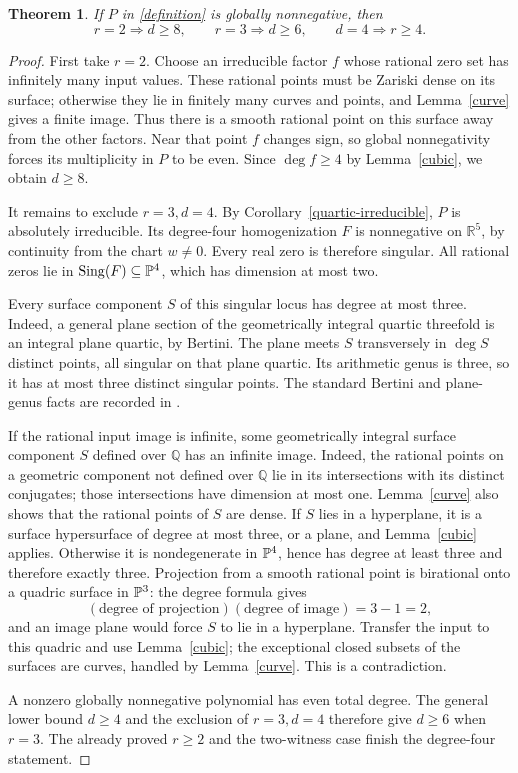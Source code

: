 \documentclass[11pt]{article}
\newtheorem{theorem}{Theorem}[section]
\theoremstyle{remark}\newtheorem{remark}[theorem]{Remark}
\newcommand{\Q}{\mathbb Q}\newcommand{\Z}{\mathbb Z}\newcommand{\R}{\mathbb R}
\newcommand{\Sing}{\operatorname{Sing}}\newcommand{\rad}{\operatorname{rad}}
\begin{document}
\begin{theorem}\label{nonnegative}
If \(P\) in \eqref{definition} is globally nonnegative, then
\[
 r=2\Longrightarrow d\ge8,\qquad
 r=3\Longrightarrow d\ge6,\qquad
 d=4\Longrightarrow r\ge4.
\]
\end{theorem}
\begin{proof}
First take \(r=2\). Choose an irreducible factor \(f\) whose rational zero set has infinitely many input values. These rational points must be Zariski dense on its surface; otherwise they lie in finitely many curves and points, and Lemma~\ref{curve} gives a finite image. Thus there is a smooth rational point on this surface away from the other factors. Near that point \(f\) changes sign, so global nonnegativity forces its multiplicity in \(P\) to be even. Since \(\deg f\ge4\) by Lemma~\ref{cubic}, we obtain \(d\ge8\).

It remains to exclude \(r=3,d=4\). By Corollary~\ref{quartic-irreducible}, \(P\) is absolutely irreducible. Its degree-four homogenization \(F\) is nonnegative on \(\R^5\), by continuity from the chart \(w\ne0\). Every real zero is therefore singular. All rational zeros lie in \(\Sing(F)\subseteq\PP^4\), which has dimension at most two.

Every surface component \(S\) of this singular locus has degree at most three. Indeed, a general plane section of the geometrically integral quartic threefold is an integral plane quartic, by Bertini. The plane meets \(S\) transversely in \(\deg S\) distinct points, all singular on that plane quartic. Its arithmetic genus is three, so it has at most three distinct singular points. The standard Bertini and plane-genus facts are recorded in \cite{Stacks}.

If the rational input image is infinite, some geometrically integral surface component \(S\) defined over \(\Q\) has an infinite image. Indeed, the rational points on a geometric component not defined over \(\Q\) lie in its intersections with its distinct conjugates; those intersections have dimension at most one. Lemma~\ref{curve} also shows that the rational points of \(S\) are dense. If \(S\) lies in a hyperplane, it is a surface hypersurface of degree at most three, or a plane, and Lemma~\ref{cubic} applies. Otherwise it is nondegenerate in \(\mathbb P^4\), hence has degree at least three and therefore exactly three. Projection from a smooth rational point is birational onto a quadric surface in \(\mathbb P^3\): the degree formula gives
\[
 (\text{degree of projection})(\text{degree of image})=3-1=2,
\]
and an image plane would force \(S\) to lie in a hyperplane. Transfer the input to this quadric and use Lemma~\ref{cubic}; the exceptional closed subsets of the surfaces are curves, handled by Lemma~\ref{curve}. This is a contradiction.

A nonzero globally nonnegative polynomial has even total degree. The general lower bound \(d\ge4\) and the exclusion of \(r=3,d=4\) therefore give \(d\ge6\) when \(r=3\). The already proved \(r\ge2\) and the two-witness case finish the degree-four statement.
\end{proof}
\end{document}
